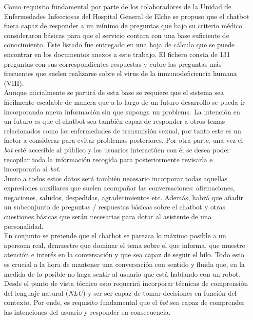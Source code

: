 Como requisito fundamental por parte de los colaboradores de la Unidad de Enfermedades Infecciosas del Hospital General de Elche se propuso que el chatbot fuera capaz de responder a un mínimo de preguntas que bajo su criterio médico consideraron básicas para que el servicio contara con una base suficiente de conocimiento. Este listado fue entregado en una hoja de cálculo que se puede encontrar en los documentos anexos a este trabajo. El fichero consta de 131 preguntas con sus correspondientes respuestas y cubre las preguntas más frecuentes que suelen realizarse sobre el virus de la inmunodeficiencia humana (VIH). \\

Aunque inicialmente se partirá de esta base se requiere que el sistema sea fácilmente escalable de manera que a lo largo de un futuro desarrollo se pueda ir incorporando nueva información sin que suponga un problema. La intención en un futuro es que el chatbot sea también capaz de responder a otros temas relacionados como las enfermedades de transmisión sexual, por tanto este es un factor a considerar para evitar problemas posteriores. Por otra parte, una vez el \textit{bot} esté accesible al público y los usuarios interactúen con él se desea poder recopilar toda la información recogida para posteriormente revisarla e incorporarla al \textit{bot}.\\

Junto a todos estos datos será también necesario incorporar todas aquellas expresiones auxiliares que suelen acompañar las conversaciones: afirmaciones, negaciones, saludos, despedidas, agradecimientos etc. Además, habrá que añadir un subconjunto de preguntas / respuestas básicas sobre el chatbot y otras cuestiones básicas que serán necesarias para dotar al asistente de una personalidad.\\

En conjunto se pretende que el chatbot se parezca lo máximo posible a un apersona real, demuestre que dominar el tema sobre el que informa, que muestre atención e interés en la conversación y que sea capaz de seguir el hilo. Todo esto es crucial a la hora de mantener una conversación con sentido y fluida que, en la medida de lo posible no haga sentir al usuario que está hablando con un robot. Desde el punto de vista técnico esto requerirá incorporar técnicas de comprensión del lenguaje natural (\textit{NLU}) y ser ser capaz de tomar decisiones en función del contexto. Por ende, es requisito fundamental que el \textit{bot} sea capaz de comprender las intenciones del usuario y responder en consecuencia.\\

